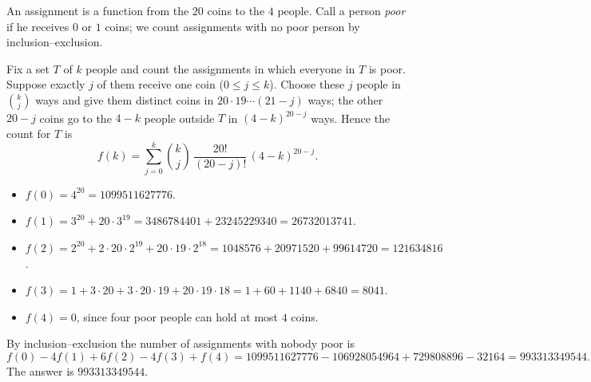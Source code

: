 An assignment is a function from the $20$ coins to the $4$ people. Call a person \emph{poor} if he receives $0$ or $1$ coins; we count assignments with no poor person by inclusion--exclusion.

Fix a set $T$ of $k$ people and count the assignments in which everyone in $T$ is poor. Suppose exactly $j$ of them receive one coin ($0\le j\le k$). Choose these $j$ people in $\binom kj$ ways and give them distinct coins in $20\cdot19\cdots(21-j)$ ways; the other $20-j$ coins go to the $4-k$ people outside $T$ in $(4-k)^{20-j}$ ways. Hence the count for $T$ is
\[
f(k)=\sum_{j=0}^{k}\binom kj\,\dfrac{20!}{(20-j)!}\,(4-k)^{20-j}.
\]
\begin{itemize}
\item $f(0)=4^{20}=1099511627776$.
\item $f(1)=3^{20}+20\cdot3^{19}=3486784401+23245229340=26732013741$.
\item $f(2)=2^{20}+2\cdot20\cdot2^{19}+20\cdot19\cdot2^{18}=1048576+20971520+99614720=121634816$.
\item $f(3)=1+3\cdot20+3\cdot20\cdot19+20\cdot19\cdot18=1+60+1140+6840=8041$.
\item $f(4)=0$, since four poor people can hold at most $4$ coins.
\end{itemize}
By inclusion--exclusion the number of assignments with nobody poor is
\[
f(0)-4f(1)+6f(2)-4f(3)+f(4)=1099511627776-106928054964+729808896-32164=993313349544 .
\]
The answer is $\boxed{993313349544}$.
